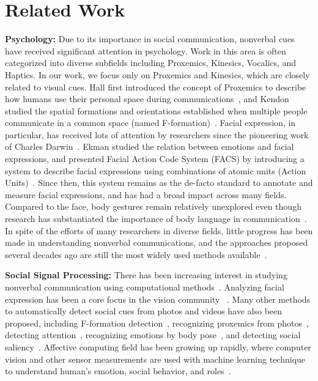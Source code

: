 \section{Related Work}

\textbf{Psychology:}
Due to its importance in social communication, nonverbal cues have received significant attention in psychology. Work in this area is often categorized into diverse subfields including Proxemics, Kinesics, Vocalics, and Haptics. In our work, we focus only on Proxemics and Kinesics, which are closely related to visual cues. Hall first introduced the concept of Proxemics to describe how humans use their personal space during communications~\cite{Hall66}, and Kendon studied the spatial formations and orientations established when multiple people communicate in a common space (named F-formation)~\cite{kendon90}. Facial expression, in particular, has received lots of attention by researchers since the pioneering work of Charles Darwin~\cite{Darwin-1872}. Ekman studied the relation between emotions and facial expressions, and presented Facial Action Code System (FACS) by introducing a system to describe facial expressions using combinations of atomic units (Action Units)~\cite{ekman1977facial}. Since then, this system remains as the de-facto standard to annotate and measure facial expressions, and has had a broad impact across many fields. Compared to the face, body gestures remain relatively unexplored even though research has substantiated the importance of body language in communication~\cite{Gelder09, Moore13, Meeren-2005, Aviezer-2012}. In spite of the efforts of many researchers in diverse fields, little progress has been made in understanding nonverbal communications, and the approaches proposed several decades ago are still the most widely used methods available~\cite{Moore13}.







\textbf{Social Signal Processing:}
There has been increasing interest in studying nonverbal communication using computational methods~\cite{vinciarelli2009social, vinciarelli2012bridging}. Analyzing facial expression has been a core focus in the vision community ~\cite{ChuDC13, Torre15, shan2009facial}. Many other methods to automatically detect social cues from photos and videos have also been proposed, including F-formation detection~\cite{setti2015f}, recognizing proxemics from photos~\cite{yang2012recognizing}, detecting attention~\cite{Fathi-2012}, recognizing emotions by body pose~\cite{schindler2008recognizing}, and detecting social saliency~\cite{park20123d}. Affective computing field has been growing up rapidly, where computer vision and other sensor measurements are used with machine learning technique to understand human's emotion, social behavior, and roles~\cite{picard1997affective, picard2003affective,poria2017review}. 

